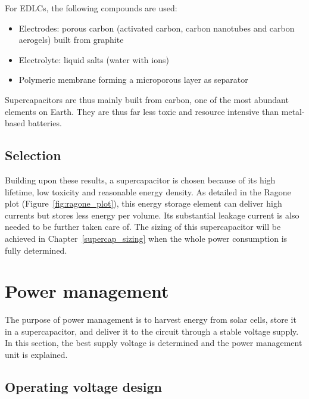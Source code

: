 \documentclass{EPL-master-thesis-covers-EN}
\begin{document}
For EDLCs, the following compounds are used:

\begin{itemize}
 \item Electrodes: porous carbon (activated carbon, carbon nanotubes and carbon aerogels) built from graphite \cite{Hastak}
 \item Electrolyte: liquid salts (water with ions)
 \item Polymeric membrane forming a microporous layer as separator
\end{itemize}

Supercapacitors are thus mainly built from carbon, one of the most abundant elements on Earth. They are thus far less toxic and resource intensive than metal-based batteries.

    
\section{Selection}

Building upon these results, a supercapacitor is chosen because of its high lifetime, low toxicity and reasonable energy density. As detailed in the Ragone plot (Figure~\ref{fig:ragone_plot}), this energy storage element can deliver high currents but stores less energy per volume. Its substantial leakage current is also needed to be further taken care of. The sizing of this supercapacitor will be achieved in Chapter~\ref{supercap_sizing} when the whole power consumption is fully determined. 


\chapter{Power management}

The purpose of power management is to harvest energy from solar cells, store it in a supercapacitor, and deliver it to the circuit through a stable voltage supply. In this section, the best supply voltage is determined and the power management unit is explained.

\section{Operating voltage design}
\label{section:operating_voltage}
\end{document}

